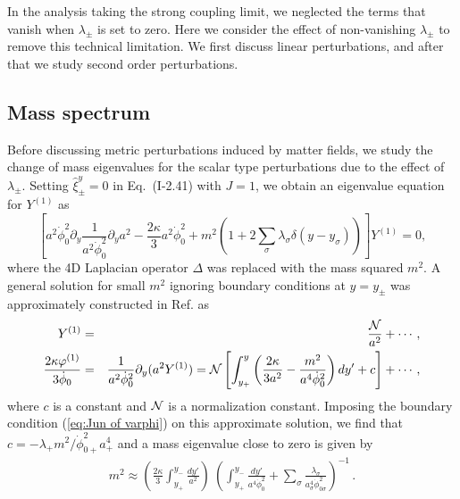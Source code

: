 \documentclass[a4paper,showpacs,preprintnumbers,amsmath,amssymb]{revtex4}
\begin{document}
In the analysis taking the strong coupling limit, we neglected the terms that vanish when $\lambda_\pm$ is set to zero. 
Here we consider the effect of non-vanishing $\lambda_\pm$ to remove this technical limitation. 
We first discuss linear perturbations, and after that we study second order perturbations. 


\subsection{Mass spectrum}

Before discussing metric perturbations induced by matter fields, we study the change of mass eigenvalues for the scalar type perturbations due to the effect of $\lambda_\pm$. 
Setting $\hat\xi_\pm^y =0$ in 
Eq.~(I-2.41) with $J=1$, we obtain an eigenvalue equation for 
$Y^{(1)}$ as 
\begin{equation}
\left[a^2\dot\phi^2_0\partial_y \frac{1}{a^2\dot\phi_0^2}\partial_y
  a^2 -\frac{2\kappa}{3} a^2\dot\phi_0^2 
 +m^2\left(1+2\sum_\sigma \lambda_\sigma \delta (y-y_\sigma)\right)\right] 
  Y^{(1)}=0, 
\label{eq:eigenY}
\end{equation}
where the 4D Laplacian operator $\Delta$ was replaced with the mass squared $m^2$. 
A general solution for small $m^2$ ignoring boundary conditions 
at $y=y_{\pm}$ was approximately constructed in Ref. \cite{Tanaka:2000er}  as 
\begin{eqnarray}
  Y^{(1)} & = & \frac{{\cal N}}{a^2}+\cdots\,, 
\cr
    \frac{2\kappa \varphi^{(1)}}{3\dot\phi_0} 
 &=&
   \frac{1}{a^2\dot\phi_0^2}\partial_y (a^2 Y^{(1)})
     =
{\cal N}\left[\int_{y_+}^{y} \left(
             \frac{2\kappa}{3 a^2 }
            -\frac{m^2}{a^4 \dot\phi_0^2 }\right)dy'
          +c \right]+\cdots\, , 
\label{eq:expansion}
\end{eqnarray}
where $c$ is a constant and ${\cal N}$ is a normalization constant. 
Imposing the boundary condition (\ref{eq:Jun of varphi}) on this approximate solution, we find that $c=-\lambda_+m^2/\dot\phi_{0+}^2a^4_+$ and a mass eigenvalue close to zero is given by 
\begin{eqnarray}
  m^2 \approx \left(\frac{2\kappa}{3}\int_{y_+}^{y_-}
            \frac{dy'}{a^2 }\right)
      ~\left(\int_{y_+}^{y_-}
            \frac{dy'}{a^4 \dot\phi_0^2 }+\sum_\sigma \frac{\lambda_\sigma}
             {a^4_\sigma\dot\phi_{0\sigma}^2}
   \right)^{-1} \,.
\label{eq:mass}
\end{eqnarray}
\end{document}
